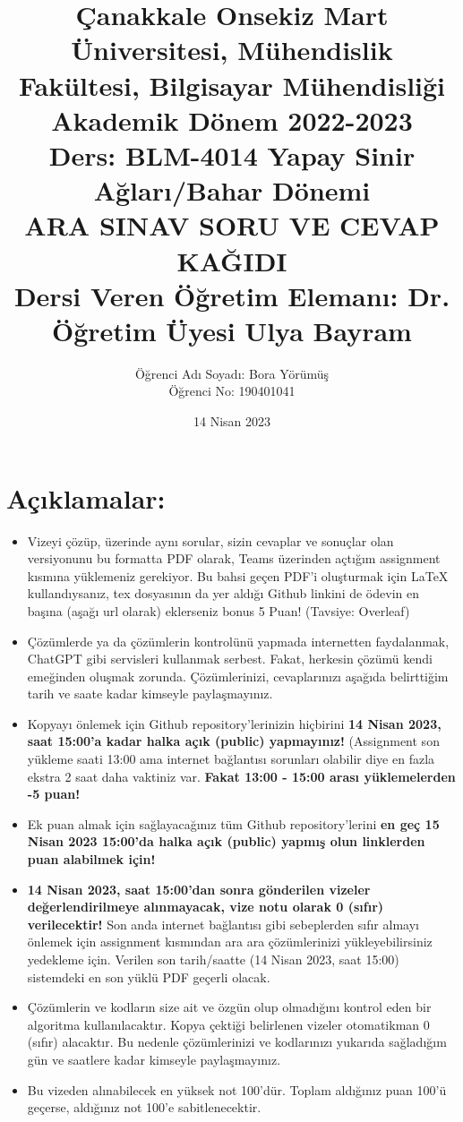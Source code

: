 \documentclass[11pt]{article}
\title{Çanakkale Onsekiz Mart Üniversitesi, Mühendislik Fakültesi, Bilgisayar Mühendisliği Akademik Dönem 2022-2023\\
Ders: BLM-4014 Yapay Sinir Ağları/Bahar Dönemi\\ 
ARA SINAV SORU VE CEVAP KAĞIDI\\
Dersi Veren Öğretim Elemanı: Dr. Öğretim Üyesi Ulya Bayram}
\author{%
\begin{minipage}{\textwidth}
\raggedright
Öğrenci Adı Soyadı: Bora Yörümüş\\ %
Öğrenci No: 190401041
\end{minipage}%
}
\date{14 Nisan 2023}
\begin{document}
\maketitle

\vspace{-.5in}
\section*{Açıklamalar:}
\begin{itemize}
    \item Vizeyi çözüp, üzerinde aynı sorular, sizin cevaplar ve sonuçlar olan versiyonunu bu formatta PDF olarak, Teams üzerinden açtığım assignment kısmına yüklemeniz gerekiyor. Bu bahsi geçen PDF'i oluşturmak için LaTeX kullandıysanız, tex dosyasının da yer aldığı Github linkini de ödevin en başına (aşağı url olarak) eklerseniz bonus 5 Puan! (Tavsiye: Overleaf)
    \item Çözümlerde ya da çözümlerin kontrolünü yapmada internetten faydalanmak, ChatGPT gibi servisleri kullanmak serbest. Fakat, herkesin çözümü kendi emeğinden oluşmak zorunda. Çözümlerinizi, cevaplarınızı aşağıda belirttiğim tarih ve saate kadar kimseyle paylaşmayınız. 
    \item Kopyayı önlemek için Github repository'lerinizin hiçbirini \textbf{14 Nisan 2023, saat 15:00'a kadar halka açık (public) yapmayınız!} (Assignment son yükleme saati 13:00 ama internet bağlantısı sorunları olabilir diye en fazla ekstra 2 saat daha vaktiniz var. \textbf{Fakat 13:00 - 15:00 arası yüklemelerden -5 puan!}
    \item Ek puan almak için sağlayacağınız tüm Github repository'lerini \textbf{en geç 15 Nisan 2023 15:00'da halka açık (public) yapmış olun linklerden puan alabilmek için!}
    \item \textbf{14 Nisan 2023, saat 15:00'dan sonra gönderilen vizeler değerlendirilmeye alınmayacak, vize notu olarak 0 (sıfır) verilecektir!} Son anda internet bağlantısı gibi sebeplerden sıfır almayı önlemek için assignment kısmından ara ara çözümlerinizi yükleyebilirsiniz yedekleme için. Verilen son tarih/saatte (14 Nisan 2023, saat 15:00) sistemdeki en son yüklü PDF geçerli olacak.
    \item Çözümlerin ve kodların size ait ve özgün olup olmadığını kontrol eden bir algoritma kullanılacaktır. Kopya çektiği belirlenen vizeler otomatikman 0 (sıfır) alacaktır. Bu nedenle çözümlerinizi ve kodlarınızı yukarıda sağladığım gün ve saatlere kadar kimseyle paylaşmayınız.
    \item Bu vizeden alınabilecek en yüksek not 100'dür. Toplam aldığınız puan 100'ü geçerse, aldığınız not 100'e sabitlenecektir.

\end{itemize}
\end{document}
